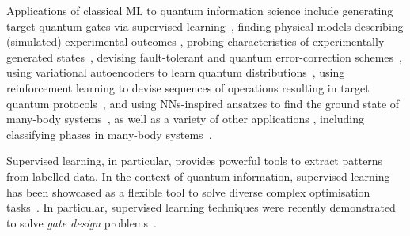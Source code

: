 Applications of classical ML to quantum information science include generating target quantum gates via supervised learning~\cite{banchi2016quantum}, finding physical models describing (simulated) experimental outcomes \cite{iten2020discovering,nautrup2020operationally}, probing characteristics of experimentally generated states~\cite{fujita2018construction,gray2018machinelearningassisted,havlíček2019supervised,canabarro2019machine,agresti2019pattern}, devising fault-tolerant and quantum error-correction schemes~\cite{liu2019neural},
using variational autoencoders to learn quantum distributions~\cite{rocchetto2018learning}, using reinforcement learning to devise sequences of operations resulting in target quantum protocols~\cite{melnikov2014projective,makmal2016metalearning,melnikov2017projective,melnikov2018benchmarking,melnikov2018active,wallnöfer2019machine,flamini2019photonic},
and using \acp{NN}-inspired ansatzes to find the ground state of many-body systems~\cite{carleo2017solving}, as well as a variety of other applications \cite{jia2019quantum,torlai2019integrating,cui2019directions,carleo2019machine}, including classifying phases in many-body systems~\cite{wang2016discovering,carrasquilla2017machine,van2017learning,deng2017machine,kaubruegger2018chiral}.


Supervised learning, in particular, provides powerful tools to extract patterns from labelled data.
In the context of quantum information, supervised learning has been showcased as a flexible tool to solve diverse complex optimisation tasks~\cite{zdeborov2017machine,carrasquilla2017machine,carleo2017solving,van2017learning,schoenholz2016structural,torlai2017manybody,rocchetto2019experimental,melnikov2018active,fujita2018construction}.
In particular, supervised learning techniques were recently demonstrated to solve \emph{gate design} problems~\cite{banchi2016quantum,innocenti2018supervised,innocenti2018approximate}.

